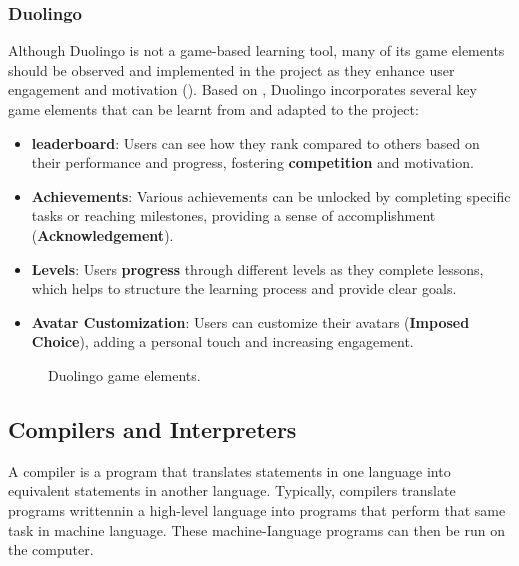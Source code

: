 \subsubsection{Duolingo}
Although Duolingo is not a game-based learning tool, many of its game elements should be observed and implemented in the project as they enhance user engagement and motivation (\cite{mekler2017towards}). Based on \cite{toda2019analysing}, Duolingo incorporates several key game elements that can be learnt from and adapted to the project:
\begin{itemize}
    \item \textbf{leaderboard}: Users can see how they rank compared to others based on their performance and progress, fostering \textbf{competition} and motivation.
    \item \textbf{Achievements}: Various achievements can be unlocked by completing specific tasks or reaching milestones, providing a sense of accomplishment (\textbf{Acknowledgement}).
    \item \textbf{Levels}: Users \textbf{progress} through different levels as they complete lessons, which helps to structure the learning process and provide clear goals.
    \item \textbf{Avatar Customization}: Users can customize their avatars (\textbf{Imposed Choice}), adding a personal touch and increasing engagement.
\end{itemize}
\begin{figure}[H]
    \centering
    \caption{Duolingo game elements.}
\end{figure}


\subsection{Compilers and Interpreters}
A compiler is a program that translates statements in one language into equivalent statements in another language. Typically, compilers translate programs writtennin a high-level language into programs that perform that same task in machine language. These machine-Ianguage programs can then be run on the computer. \cite{Grillmeyer1998}

